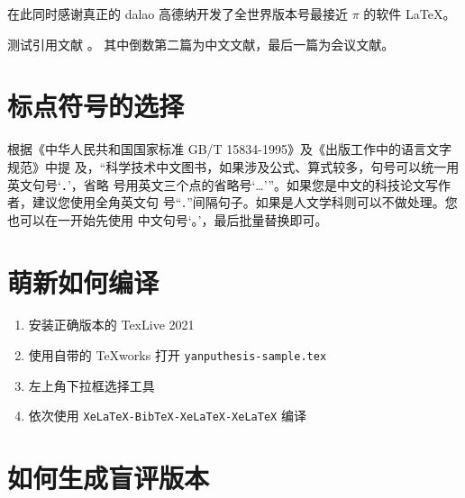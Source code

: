 \documentclass[lang=chs, degree=phd, blindreview=false, winfonts=true]{yanputhesis}
\begin{document}
在此同时感谢真正的 dalao 高德纳开发了全世界版本号最接近 $\pi$ 的软件
\LaTeX \cite{knuth1986the}\nocite{lamport1989latex}。

测试引用文献 \cite{szegedy2015going, shen2021peridynamic, chen2014maiyuan, chen2018autonomous}。
其中倒数第二篇为中文文献，最后一篇为会议文献。

\section{标点符号的选择}

根据《中华人民共和国国家标准 GB/T 15834-1995》及《出版工作中的语言文字规范》中提
及，“科学技术中文图书，如果涉及公式、算式较多，句号可以统一用英文句号‘．’，省略
号用英文三个点的省略号‘…’”。如果您是中文的科技论文写作者，建议您使用全角英文句
号“\lstinline`．`”间隔句子。如果是人文学科则可以不做处理。您也可以在一开始先使用
中文句号‘。’，最后批量替换即可。

\section{萌新如何编译}

\begin{enumerate}
    \setlength{\itemsep}{0pt}
    \item 安装正确版本的 TexLive 2021
    \item 使用自带的 TeXworks 打开 \lstinline`yanputhesis-sample.tex`
    \item 左上角下拉框选择工具
    \item 依次使用 \lstinline`XeLaTeX-BibTeX-XeLaTeX-XeLaTeX` 编译
\end{enumerate}

\section{如何生成盲评版本}
\end{document}
